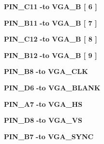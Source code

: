 \begin{DoxyCompactItemize}
\item 
{\bf P\+I\+N\+\_\+\+C11} {\bfseries \textcolor{vhdlchar}{-\/}\textcolor{keywordflow}{to}\textcolor{vhdlchar}{ }\textcolor{vhdlchar}{V\+G\+A\+\_\+B}\textcolor{vhdlchar}{ }\textcolor{vhdlchar}{[}\textcolor{vhdlchar}{ } \textcolor{vhdldigit}{6} \textcolor{vhdlchar}{ }\textcolor{vhdlchar}{]}\textcolor{vhdlchar}{ }} 
\item 
{\bf P\+I\+N\+\_\+\+B11} {\bfseries \textcolor{vhdlchar}{-\/}\textcolor{keywordflow}{to}\textcolor{vhdlchar}{ }\textcolor{vhdlchar}{V\+G\+A\+\_\+B}\textcolor{vhdlchar}{ }\textcolor{vhdlchar}{[}\textcolor{vhdlchar}{ } \textcolor{vhdldigit}{7} \textcolor{vhdlchar}{ }\textcolor{vhdlchar}{]}\textcolor{vhdlchar}{ }} 
\item 
{\bf P\+I\+N\+\_\+\+C12} {\bfseries \textcolor{vhdlchar}{-\/}\textcolor{keywordflow}{to}\textcolor{vhdlchar}{ }\textcolor{vhdlchar}{V\+G\+A\+\_\+B}\textcolor{vhdlchar}{ }\textcolor{vhdlchar}{[}\textcolor{vhdlchar}{ } \textcolor{vhdldigit}{8} \textcolor{vhdlchar}{ }\textcolor{vhdlchar}{]}\textcolor{vhdlchar}{ }} 
\item 
{\bf P\+I\+N\+\_\+\+B12} {\bfseries \textcolor{vhdlchar}{-\/}\textcolor{keywordflow}{to}\textcolor{vhdlchar}{ }\textcolor{vhdlchar}{V\+G\+A\+\_\+B}\textcolor{vhdlchar}{ }\textcolor{vhdlchar}{[}\textcolor{vhdlchar}{ } \textcolor{vhdldigit}{9} \textcolor{vhdlchar}{ }\textcolor{vhdlchar}{]}\textcolor{vhdlchar}{ }} 
\item 
{\bf P\+I\+N\+\_\+\+B8} {\bfseries \textcolor{vhdlchar}{-\/}\textcolor{keywordflow}{to}\textcolor{vhdlchar}{ }\textcolor{vhdlchar}{V\+G\+A\+\_\+\+C\+LK}\textcolor{vhdlchar}{ }} 
\item 
{\bf P\+I\+N\+\_\+\+D6} {\bfseries \textcolor{vhdlchar}{-\/}\textcolor{keywordflow}{to}\textcolor{vhdlchar}{ }\textcolor{vhdlchar}{V\+G\+A\+\_\+\+B\+L\+A\+NK}\textcolor{vhdlchar}{ }} 
\item 
{\bf P\+I\+N\+\_\+\+A7} {\bfseries \textcolor{vhdlchar}{-\/}\textcolor{keywordflow}{to}\textcolor{vhdlchar}{ }\textcolor{vhdlchar}{V\+G\+A\+\_\+\+HS}\textcolor{vhdlchar}{ }} 
\item 
{\bf P\+I\+N\+\_\+\+D8} {\bfseries \textcolor{vhdlchar}{-\/}\textcolor{keywordflow}{to}\textcolor{vhdlchar}{ }\textcolor{vhdlchar}{V\+G\+A\+\_\+\+VS}\textcolor{vhdlchar}{ }} 
\item 
{\bf P\+I\+N\+\_\+\+B7} {\bfseries \textcolor{vhdlchar}{-\/}\textcolor{keywordflow}{to}\textcolor{vhdlchar}{ }\textcolor{vhdlchar}{V\+G\+A\+\_\+\+S\+Y\+NC}\textcolor{vhdlchar}{ }} 
\item 

\end{DoxyCompactItemize}
